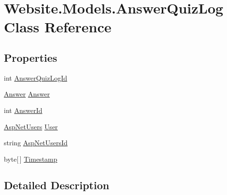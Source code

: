 \hypertarget{class_website_1_1_models_1_1_answer_quiz_log}{}\section{Website.\+Models.\+Answer\+Quiz\+Log Class Reference}
\label{class_website_1_1_models_1_1_answer_quiz_log}
\subsection*{Properties}
\begin{DoxyCompactItemize}
\item 
int \hyperlink{class_website_1_1_models_1_1_answer_quiz_log_afcc76aedf266b68d199fa0154b962eff}{Answer\+Quiz\+Log\+Id}
\item 
\hyperlink{class_website_1_1_models_1_1_answer}{Answer} \hyperlink{class_website_1_1_models_1_1_answer_quiz_log_a0c1def8b324bd60b6ae98bf8785543fd}{Answer}
\item 
int \hyperlink{class_website_1_1_models_1_1_answer_quiz_log_af96a3fe6f6f064cbc98e2a82279aff0a}{Answer\+Id}
\item 
\hyperlink{class_website_1_1_asp_net_users}{Asp\+Net\+Users} \hyperlink{class_website_1_1_models_1_1_answer_quiz_log_aebef58b18794b0ea88e5c4a9c2449621}{User}
\item 
string \hyperlink{class_website_1_1_models_1_1_answer_quiz_log_ad693cfd30714a20ade4f1156b501e2c0}{Asp\+Net\+Users\+Id}
\item 
byte\mbox{[}$\,$\mbox{]} \hyperlink{class_website_1_1_models_1_1_answer_quiz_log_a5a7b5ad12a824501c39793e9fcc00c01}{Timestamp}
\end{DoxyCompactItemize}


\subsection{Detailed Description}



